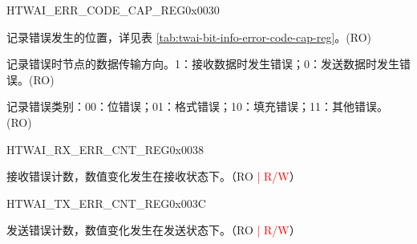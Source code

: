 \begin{register}{H}{TWAI\_ERR\_CODE\_CAP\_REG}{0x0030}\label{regdesc:TWAIERRCODECAPREG}
%
%
%
%
\regnewline%
\begin{regdesc}\begin{reglist}
\label{fielddesc:TWAIECCSEGMENT}\item [TWAI\_ECC\_SEGMENT] 记录错误发生的位置，详见表 \ref{tab:twai-bit-info-error-code-cap-reg}。(RO)
\label{fielddesc:TWAIECCDIRECTION}\item [TWAI\_ECC\_DIRECTION] 记录错误时节点的数据传输方向。1：接收数据时发生错误；0：发送数据时发生错误。(RO)
\label{fielddesc:TWAIECCTYPE}\item [TWAI\_ECC\_TYPE] 记录错误类别：00：位错误；01：格式错误；10：填充错误；11：其他错误。(RO)
\end{reglist}\end{regdesc}
\end{register}


\begin{register}{H}{TWAI\_RX\_ERR\_CNT\_REG}{0x0038}\label{regdesc:TWAIRXERRCNTREG}
%
%
\regnewline%
\begin{regdesc}\begin{reglist}
\label{fielddesc:TWAIRXERRCNT}\item [TWAI\_RX\_ERR\_CNT] 接收错误计数，数值变化发生在接收状态下。（RO \textcolor{red}{| R/W}）
\end{reglist}\end{regdesc}
\end{register}


\begin{register}{H}{TWAI\_TX\_ERR\_CNT\_REG}{0x003C}\label{regdesc:TWAITXERRCNTREG}
%
%
\regnewline%
\begin{regdesc}\begin{reglist}
\label{fielddesc:TWAITXERRCNT}\item [TWAI\_TX\_ERR\_CNT] 发送错误计数，数值变化发生在发送状态下。（RO \textcolor{red}{| R/W}）
\end{reglist}\end{regdesc}
\end{register}


